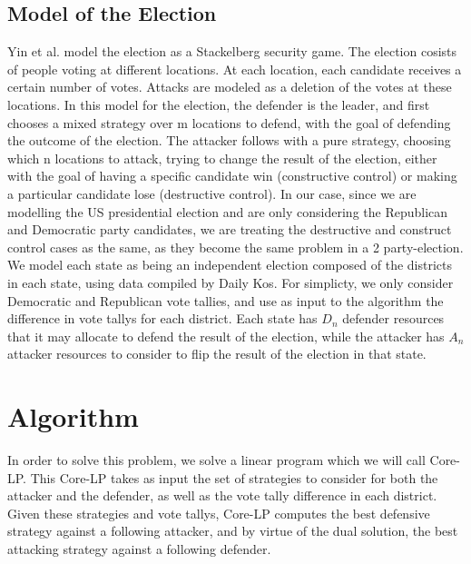 \documentclass[letterpaper]{article} %
\begin{document}
\subsection{Model of the Election}
Yin et al. model the election as a Stackelberg security game. The election cosists of people voting at different locations. At each location, each candidate receives a certain number of votes. Attacks are modeled as a deletion of the votes at these locations. In this model for the election, the defender is the leader, and first chooses a mixed strategy over m locations to defend, with the goal of defending the outcome of the election. The attacker follows with a pure strategy, choosing which n locations to attack, trying to change the result of the election, either with the goal of having a specific candidate win (constructive control) or making a particular candidate lose (destructive control). In our case, since we are modelling the US presidential election and are only considering the Republican and Democratic party candidates, we are treating the destructive and construct control cases as the same, as they become the same problem in a 2 party-election. We model each state as being an independent election composed of the districts in each state, using data compiled by Daily Kos. For simplicty, we only consider Democratic and Republican vote tallies, and use as input to the algorithm the difference in vote tallys for each district. Each state has $D_n$ defender resources that it may allocate to defend the result of the election, while the attacker has $A_n$ attacker resources to consider to flip the result of the election in that state. 
\section{Algorithm}

In order to solve this problem, we solve a linear program which we will call Core-LP. This Core-LP takes as input the set of strategies to consider for both the attacker and the defender, as well as the vote tally difference in each district. Given these strategies and vote tallys, Core-LP computes the best defensive strategy against a following attacker, and by virtue of the dual solution, the best attacking strategy against a following defender. 
\end{document}
